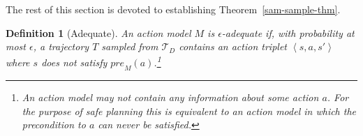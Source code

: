 \documentclass{article}
\newtheorem{definition}{Definition}
\newcommand{\tuple}[1]{\ensuremath{\left \langle #1 \right \rangle }}
\newcommand{\pre}{\textit{pre}}
\begin{document}
The rest of this section is devoted to establishing Theorem~\ref{sam-sample-thm}. 

\begin{definition}[Adequate]
An action model $M$ is {\em $\epsilon$-adequate} if, with probability at most $\epsilon$, a trajectory $T$ sampled from $\mathcal{T}_D$ contains an action triplet $\tuple{s,a,s'}$ where 
$s$ does not satisfy $\pre_M(a)$.\footnote{An action model may not contain any information about some action $a$. 
For the purpose of safe planning this is equivalent to an action model in which the precondition to $a$ can never be satisfied.}
\end{definition}
\end{document}

